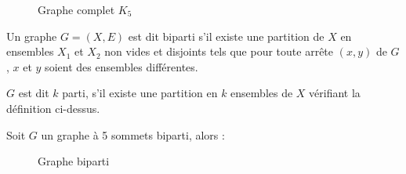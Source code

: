 \begin{example}
\begin{figure}[h]
\begin{minipage} {0.45\textwidth}
            \caption{Graphe complet \( K_5 \)}
            \label{fig:K5-entiers}
        \end{minipage}
      \end{figure}
\end{example}

\begin{definition}[Bipartisme]
    Un graphe $G = (X,E)$ est dit biparti s'il existe une partition de $X$ en ensembles $X_1$ et $X_2$ non vides et disjoints tels que pour toute arrête $(x,y)$
    de $G$, $x$ et $y$ soient des ensembles différentes.
\end{definition}

\begin{remark}
    $G$ est dit $k$ parti, s'il existe une partition en $k$ ensembles de $X$ vérifiant la définition ci-dessus.
\end{remark}


\begin{example}
    Soit $G$ un graphe à 5 sommets biparti, alors :
    \begin{figure}[h]
        \centering
        \caption{Graphe biparti}
        \label{fig:K5-entiers}
    \end{figure}
\end{example}


